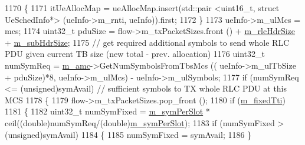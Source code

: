 \begin{DoxyCode}
1170                                                 \{
1171                                                         itUeAllocMap = ueAllocMap.insert(std::pair
       <uint16\_t, struct UeSchedInfo*> (ueInfo->m\_rnti, ueInfo)).first;
1172                                                 \}
1173                                                 ueInfo->m\_ulMcs = mcs;
1174                                                 uint32\_t pduSize = flow->m\_txPacketSizes.front () + 
      \hyperlink{classns3_1_1MmWaveFlexTtiMaxWeightMacScheduler_a12646efe5a10dfd27c8839b224b2ed53}{m\_rlcHdrSize} + \hyperlink{classns3_1_1MmWaveFlexTtiMaxWeightMacScheduler_a0f66f1575529b6532871202961e92c86}{m\_subHdrSize};
1175                                                 \textcolor{comment}{// get required additional symbols to send whole RLC PDU
       given current TB size (new total - prev. allocation)}
1176                                                 uint32\_t numSymReq = \hyperlink{classns3_1_1MmWaveFlexTtiMaxWeightMacScheduler_a36c22ad89fe5d6743a058f253a43a70d}{m\_amc}->GetNumSymbolsFromTbsMcs ((
      ueInfo->m\_ulTbSize + pduSize)*8, ueInfo->m\_ulMcs) - ueInfo->m\_ulSymbols;
1177                                                 \textcolor{keywordflow}{if} (numSymReq <= (\textcolor{keywordtype}{unsigned})symAvail)    \textcolor{comment}{// sufficient
       symbols to TX whole RLC PDU at this MCS}
1178                                                 \{
1179                                                         flow->m\_txPacketSizes.pop\_front ();
1180                                                         \textcolor{keywordflow}{if} (\hyperlink{classns3_1_1MmWaveFlexTtiMaxWeightMacScheduler_a5642744f4685af9143c44bd8ed23077b}{m\_fixedTti})
1181                                                         \{
1182                                                                 uint32\_t numSymFixed = 
      \hyperlink{classns3_1_1MmWaveFlexTtiMaxWeightMacScheduler_a1f72c01284b245a37f959230bf15e46b}{m\_symPerSlot} * ceil((\textcolor{keywordtype}{double})numSymReq/(\textcolor{keywordtype}{double})\hyperlink{classns3_1_1MmWaveFlexTtiMaxWeightMacScheduler_a1f72c01284b245a37f959230bf15e46b}{m\_symPerSlot});
1183                                                                 \textcolor{keywordflow}{if} (numSymFixed > (\textcolor{keywordtype}{unsigned})symAvail)
1184                                                                 \{
1185                                                                         numSymFixed = symAvail;
1186                                                                 \}

\end{DoxyCode}
